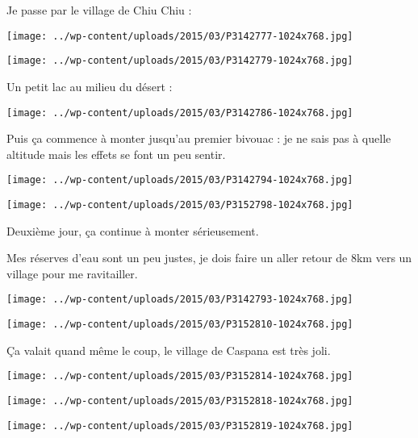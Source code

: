 \pagebreak
Je passe par le village de Chiu Chiu :
\begin{center} \texttt{[image: ../wp-content/uploads/2015/03/P3142777-1024x768.jpg]} \end{center}
\begin{center} \texttt{[image: ../wp-content/uploads/2015/03/P3142779-1024x768.jpg]} \end{center}
\vspace{-\topsep}
\vspace{-3.25mm}

\pagebreak
Un petit lac au milieu du désert :
\begin{center} \texttt{[image: ../wp-content/uploads/2015/03/P3142786-1024x768.jpg]} \end{center}

Puis ça commence à monter jusqu'au premier bivouac : je ne sais pas à quelle altitude mais les effets se font un peu sentir.
\begin{center} \texttt{[image: ../wp-content/uploads/2015/03/P3142794-1024x768.jpg]} \end{center}
\begin{center} \texttt{[image: ../wp-content/uploads/2015/03/P3152798-1024x768.jpg]} \end{center}

 Deuxième jour, ça continue à monter sérieusement.

 Mes réserves d'eau sont un peu justes, je dois faire un aller retour de 8km vers un village pour me ravitailler. 
\begin{center} \texttt{[image: ../wp-content/uploads/2015/03/P3142793-1024x768.jpg]} \end{center}
\begin{center} \texttt{[image: ../wp-content/uploads/2015/03/P3152810-1024x768.jpg]} \end{center}

 Ça valait quand même le coup, le village de Caspana est très joli.
\begin{center} \texttt{[image: ../wp-content/uploads/2015/03/P3152814-1024x768.jpg]} \end{center}
\begin{center} \texttt{[image: ../wp-content/uploads/2015/03/P3152818-1024x768.jpg]} \end{center}
\vfill
\begin{center} \texttt{[image: ../wp-content/uploads/2015/03/P3152819-1024x768.jpg]} \end{center}
\vspace{-\topsep}
\vspace{-0.75mm}


